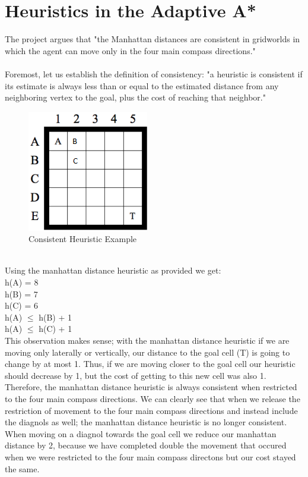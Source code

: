 \documentclass[12pt]{article}
\newcommand{\xmark}{\ding{55}}%
\newcommand\tab[1][1cm]{\hspace*{#1}}
\begin{document}
\section*{Heuristics in the Adaptive A*}
\tab The project argues that "the Manhattan distances are consistent in gridworlds in which the agent can move only in the four main compass directions." \\ \\
\tab Foremost, let us establish the definition of consistency: "a heuristic is consistent if its estimate is always less than or equal to the estimated distance from any neighboring vertex to the goal, plus the cost of reaching that neighbor."
	\begin{figure}[!htb]
		\centering
		\includegraphics[width=.4\textwidth]{heuristic_example.png}
		\caption{\label{: }Consistent Heuristic Example}
	\end{figure} \\
Using the manhattan distance heuristic as provided we get: \\
h(A) = 8 \\
h(B) = 7 \\
h(C) = 6 \\
h(A) $\leq$ h(B) + 1 \checkmark \\
h(A) $\leq$ h(C) + 1 \xmark \\
\tab This observation makes sense; with the manhattan distance heuristic if we are moving only laterally or vertically, our distance to the goal cell (T) is going to change by at most 1. Thus, if we are moving closer to the goal cell our heuristic should decrease by 1, but the cost of getting to this new cell was also 1. Therefore, the manhattan distance heuristic is always consistent when restricted to the four main compass directions. We can clearly see that when we release the restriction of movement to the four main compass directions and instead include the diagnols as well; the manhattan distance heuristic is no longer consistent. When moving on a diagnol towards the goal cell we reduce our manhattan distance by 2, because we have completed double the movement that occured when we were restricted to the four main compass directons but our cost stayed the same. \\ \\
\end{document}
